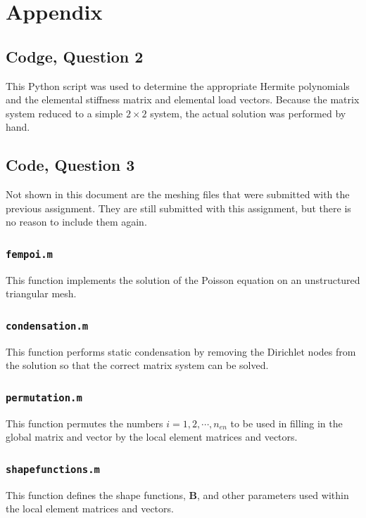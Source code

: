 \documentclass[10pt]{article}
\begin{document}
\section{Appendix}

\subsection{Codge, Question 2}

This Python script was used to determine the appropriate Hermite polynomials and the elemental stiffness matrix and elemental load vectors. Because the matrix system reduced to a simple \(2\times 2\) system, the actual solution was performed by hand.



\subsection{Code, Question 3}

Not shown in this document are the meshing files that were submitted with the previous assignment. They are still submitted with this assignment, but there is no reason to include them again.

\subsubsection{\tt fempoi.m}
This function implements the solution of the Poisson equation on an unstructured triangular mesh. 


\subsubsection{\tt condensation.m}
This function performs static condensation by removing the Dirichlet nodes from the solution so that the correct matrix system can be solved.


\subsubsection{\tt permutation.m}
This function permutes the numbers \(i=1, 2, \cdots, n_{en}\) to be used in filling in the global matrix and vector by the local element matrices and vectors.


\subsubsection{\tt shapefunctions.m}
This function defines the shape functions, \textbf{B}, and other parameters used within the local element matrices and vectors.

\end{document}
